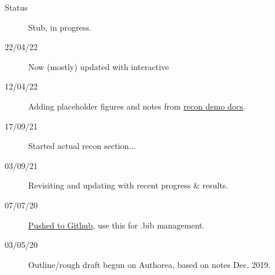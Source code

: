 \begin{description}
\item [{Status}] Stub, in progress.
\item [{22/04/22}] Now (mostly) updated with interactive 
\item [{12/04/22}] Adding placeholder figures and notes from \href{https://pemtk.readthedocs.io/en/latest/fitting/PEMtk_analysis_demo_150621-tidy.html}{recon demo docs}.
\item [{17/09/21}] Started actual recon section...
\item [{03/09/21}] Revisiting and updating with recent progress \& results.
\item [{07/07/20}] \href{https://github.com/phockett/Extracting-Molecular-Frame-Photoionization-Dynamics-from-Experimental-Data}{Pushed to Github}, use this for .bib management.
\item [{03/05/20}] Outline/rough draft begun on Authorea, based on notes Dec. 2019.
\end{description}